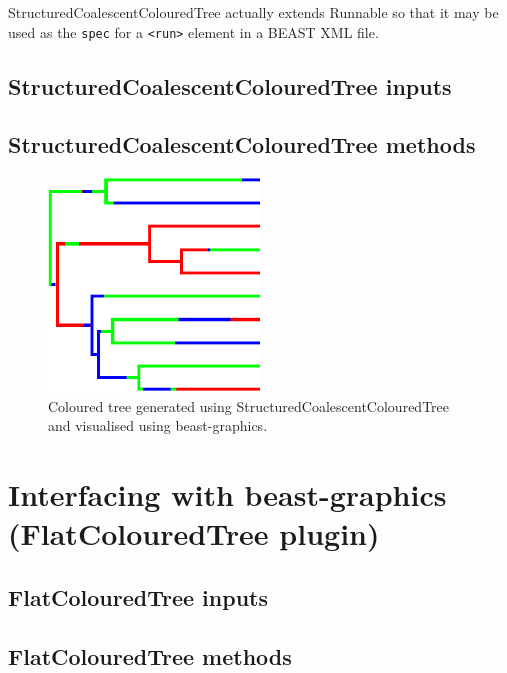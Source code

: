 \documentclass[a4paper,11pt]{paper}
\newcommand{\class}[1]{\textsf{#1}}
\newcommand{\project}[1]{\textsf{#1}}
\newcommand{\code}[1]{\texttt{#1}}
\begin{document}
\class{StructuredCoalescentColouredTree} actually extends
\class{Runnable} so that it may be used as the \code{spec} for a
\code{<run>} element in a BEAST XML file.

\subsection{StructuredCoalescentColouredTree inputs}
\subsection{StructuredCoalescentColouredTree methods}

\begin{figure}
	\centering
	\includegraphics[width=0.5\textwidth]{structuredCoalescentFig.pdf}
	\caption{Coloured tree generated using
		\class{StructuredCoalescentColouredTree} and visualised using
	\project{beast-graphics}.}
\end{figure}

\section{Interfacing with {\textsf beast-graphics} (FlatColouredTree plugin)}

\subsection{FlatColouredTree inputs}
\subsection{FlatColouredTree methods}
\end{document}
